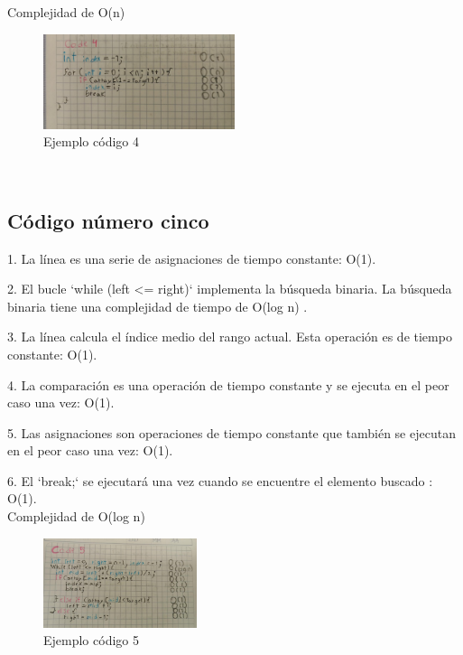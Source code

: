 \documentclass[journal, spanish]{IEEEtran}
\begin{document}
Complejidad de O(n)

\begin{figure}[H]
  \centering
  \includegraphics[width=0.5\textwidth]{WhatsApp Image 2023-09-11 at 7.59.47 PM.jpeg}
  
  \caption{Ejemplo código 4}
  \label{fig:imagen1}
\end{figure}\\
  

\subsection{Código número cinco}
1. La línea es una serie de asignaciones de tiempo constante: O(1).

2. El bucle `while (left <= right)` implementa la búsqueda binaria. La búsqueda binaria tiene una complejidad de tiempo de O(log n) .

3. La línea  calcula el índice medio del rango actual. Esta operación es de tiempo constante: O(1).

4. La comparación es una operación de tiempo constante y se ejecuta en el peor caso una vez: O(1).

5. Las asignaciones son operaciones de tiempo constante que también se ejecutan en el peor caso una vez: O(1).

6. El `break;` se ejecutará una vez cuando se encuentre el elemento buscado : O(1).\\

Complejidad de O(log n) 



\begin{figure}[H]
  \centering
  \includegraphics[width=0.4\textwidth]{WhatsApp Image 2023-09-11 at 8.00.07 PM.jpeg}
  \caption{Ejemplo código 5}
  \label{fig:imagen1}
\end{figure}
\end{document}
